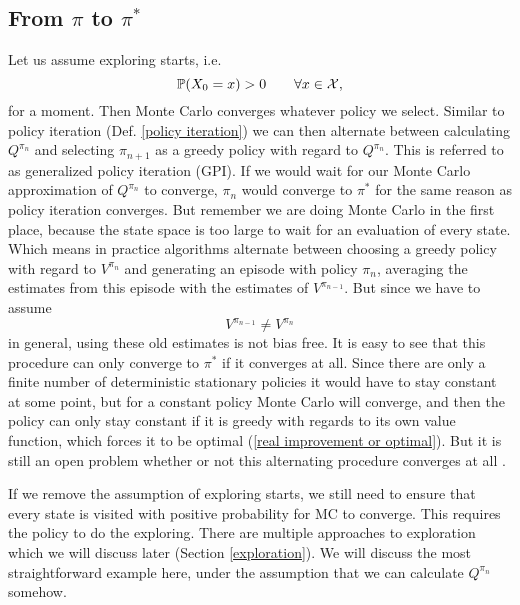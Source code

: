 \subsection{From \(\pi\) to \(\pi^*\)}
Let us assume exploring starts, i.e.
\[
	\mathbb{P}(X_0=x)>0 \qquad \forall x\in\mathcal{X},
\] 
for a moment. Then Monte Carlo converges whatever policy we select. Similar to policy iteration (Def. \ref{policy iteration}) we can then alternate between calculating \(Q^{\pi_n}\) and selecting \(\pi_{n+1}\) as a greedy policy with regard to \(Q^{\pi_n}\). This is referred to as generalized policy iteration (GPI). If we would wait for our Monte Carlo approximation of \(Q^{\pi_n}\) to converge, \(\pi_n\) would converge to \(\pi^*\) for the same reason as policy iteration converges. But remember we are doing Monte Carlo in the first place, because the state space is too large to wait for an evaluation of every state. Which means in practice algorithms alternate between choosing a greedy policy with regard to \({V^{\pi_n}}\) and generating an episode with policy \(\pi_n\), averaging the estimates from this episode with the estimates of \(V^{\pi_{n-1}}\). But since we have to assume
\[
	V^{\pi_{n-1}}\neq V^{\pi_n}
\] 
in general, using these old estimates is not bias free. It is easy to see that this procedure can only converge to \(\pi^*\) if it converges at all. Since there are only a finite number of deterministic stationary policies it would have to stay constant at some point, but for a constant policy Monte Carlo will converge, and then the policy can only stay constant if it is greedy with regards to its own value function, which forces it to be optimal (\ref{real improvement or optimal}). But it is still an open problem whether or not this alternating procedure converges at all \parencite[99]{suttonReinforcementLearningIntroduction2018a}.

If we remove the assumption of exploring starts, we still need to ensure that every state is visited with positive probability for MC to converge. This requires the policy to do the exploring. There are multiple approaches to exploration which we will discuss later (Section \ref{exploration}). We will discuss the most straightforward example here, under the assumption that we can calculate \(Q^{\pi_n}\) somehow.

